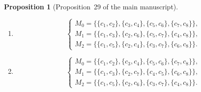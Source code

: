 \documentclass[11pt]{article}
\newtheorem{prop}{Proposition}
\begin{document}
\begin{prop}[Proposition~29 of the main manuscript]
\begin{enumerate}[label=\textbf{Case \Roman*:},leftmargin=*]
\[\begin{cases}
\end{cases}
\]
\item
\[
\begin{cases}
M_0=\{\{c_1,c_2\},\{c_3,c_4\},\{c_5,c_6\},\{c_7,c_8\}\},\\
M_1=\{\{c_1,c_3\},\{c_2,c_6\},\{c_5,c_7\},\{c_4,c_8\}\},\\
M_2=\{\{c_1,c_5\},\{c_2,c_4\},\{c_3,c_7\},\{c_6,c_8\}\}.
\end{cases}
\]
\item
\[
\begin{cases}
M_0=\{\{c_1,c_2\},\{c_3,c_4\},\{c_5,c_6\},\{c_7,c_8\}\},\\
M_1=\{\{c_1,c_3\},\{c_2,c_7\},\{c_4,c_5\},\{c_6,c_8\}\},\\
M_2=\{\{c_1,c_5\},\{c_2,c_6\},\{c_3,c_7\},\{c_4,c_8\}\}.
\end{cases}
\]
\end{enumerate}
\end{prop}
\end{document}
